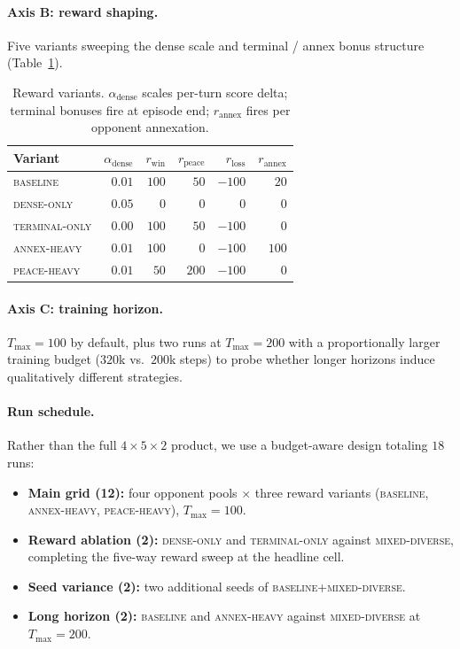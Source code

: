 \paragraph{Axis B: reward shaping.}
Five variants sweeping the dense scale and terminal / annex bonus structure
(Table~\ref{tab:rewards}).

\begin{table}[h]
\centering
\small
\begin{tabular}{lrrrrr}
\toprule
Variant & $\alpha_{\text{dense}}$ & $r_{\text{win}}$ & $r_{\text{peace}}$ &
$r_{\text{loss}}$ & $r_{\text{annex}}$ \\
\midrule
\textsc{baseline}      & $0.01$ & $100$ & $50$  & $-100$ & $20$  \\
\textsc{dense-only}    & $0.05$ & $0$   & $0$   & $0$    & $0$   \\
\textsc{terminal-only} & $0.00$ & $100$ & $50$  & $-100$ & $0$   \\
\textsc{annex-heavy}   & $0.01$ & $100$ & $0$   & $-100$ & $100$ \\
\textsc{peace-heavy}   & $0.01$ & $50$  & $200$ & $-100$ & $0$   \\
\bottomrule
\end{tabular}
\caption{Reward variants. $\alpha_{\text{dense}}$ scales per-turn score delta;
terminal bonuses fire at episode end; $r_{\text{annex}}$ fires per opponent
annexation.}
\label{tab:rewards}
\end{table}

\paragraph{Axis C: training horizon.}
$T_{\max}{=}100$ by default, plus two runs at $T_{\max}{=}200$ with a
proportionally larger training budget ($320$k vs.\ $200$k steps) to probe
whether longer horizons induce qualitatively different strategies.

\paragraph{Run schedule.}
Rather than the full $4{\times}5{\times}2$ product, we use a budget-aware
design totaling $18$ runs:

\begin{itemize}
    \item \textbf{Main grid (12):} four opponent pools $\times$ three reward
          variants (\textsc{baseline}, \textsc{annex-heavy}, \textsc{peace-heavy}),
          $T_{\max}{=}100$.
    \item \textbf{Reward ablation (2):} \textsc{dense-only} and
          \textsc{terminal-only} against \textsc{mixed-diverse}, completing
          the five-way reward sweep at the headline cell.
    \item \textbf{Seed variance (2):} two additional seeds of
          \textsc{baseline}+\textsc{mixed-diverse}.
    \item \textbf{Long horizon (2):} \textsc{baseline} and \textsc{annex-heavy}
          against \textsc{mixed-diverse} at $T_{\max}{=}200$.
\end{itemize}


